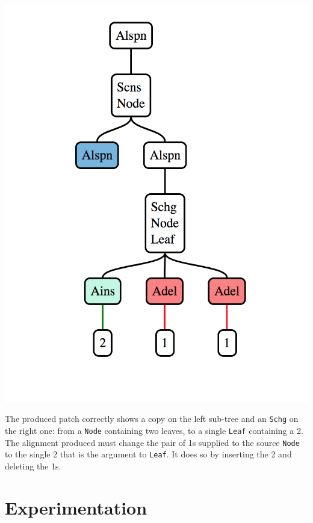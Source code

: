 \documentclass[11pt, titlepage]{article}
\newcommand{\toHaskell}[1]{\texttt{#1}\xspace}
\newcommand{\toClojure}[1]{\texttt{#1}\xspace}
\newcommand{\schg}{\toHaskell{Schg}}
\begin{document}
\vspace{.6em}
\begin{minipage}{\linewidth}
\centering
\includegraphics[scale=0.5]{tree.png}
\label{fig:tree}  
\end{minipage}
\vspace{.6em}

The produced patch correctly shows a copy on the left sub-tree and an \schg on the right one: from a \toClojure{Node} containing two leaves, to a single \toClojure{Leaf} containing a 2. The alignment produced must change the pair of 1s supplied to the source \toClojure{Node} to the single 2 that is the argument to \toClojure{Leaf}. It does so by inserting the 2 and deleting the 1s.

\section{Experimentation}
\end{document}
